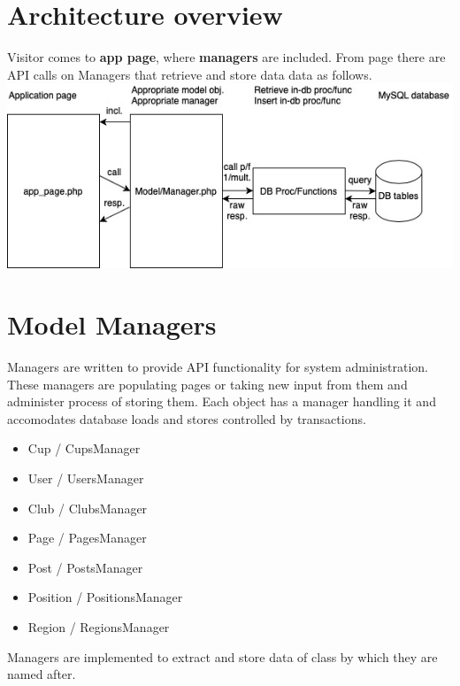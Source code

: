 \section{Architecture overview}
Visitor comes to \textbf{app page}, where \textbf{managers} are included. From page there are API calls on Managers that retrieve and store data data as follows.
\newline
\includegraphics[scale=0.707]{img/app-schema.jpg}
\newline
\section{Model Managers}
Managers are written to provide API functionality for system administration. These managers are populating pages or taking new input from them and administer process of storing them. Each object has a manager handling it and accomodates database loads and stores controlled by transactions.
\begin{itemize}
    \item Cup / CupsManager
    \item User / UsersManager
    \item Club / ClubsManager
    \item Page / PagesManager
    \item Post / PostsManager
    \item Position / PositionsManager
    \item Region / RegionsManager
\end{itemize}
Managers are implemented to extract and store data of class by which they are named after.
\newpage
